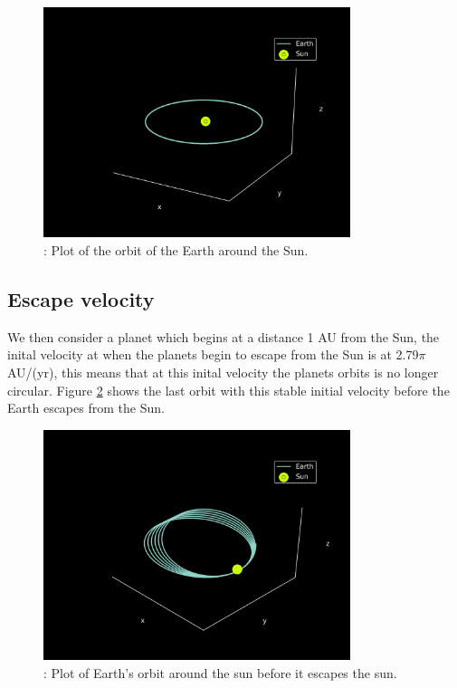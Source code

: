 \documentclass{article}
\begin{document}
\begin{figure}[H]
    \begin{center}
        \includegraphics[width=0.8\textwidth]{./Plot/Earth_orbit.png}
        \caption{: Plot of the orbit of the Earth around the Sun.}
        \label{fig:earth_orbit}
    \end{center}
\end{figure}

\subsection{Escape velocity}
We then consider a planet which begins at a distance 1 AU from the Sun, the inital velocity at when the planets begin to escape from the Sun is at 2.79$\pi$ AU/(yr), this means that at this inital velocity the planets orbits is no longer circular. Figure \ref{fig:last} shows the last orbit with this stable initial velocity before the Earth escapes from the Sun.

\begin{figure}[H]
    \begin{center}
        \includegraphics[width=0.8\textwidth]{./Plot/last_stable_orbit.png}
        \caption{: Plot of Earth's orbit around the sun before it escapes the sun.}
        \label{fig:last}
    \end{center}
\end{figure}
\end{document}

